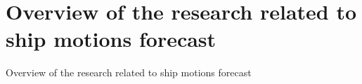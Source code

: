 \section{Overview of the research related to ship motions forecast}
Overview of the research related to ship motions forecast
